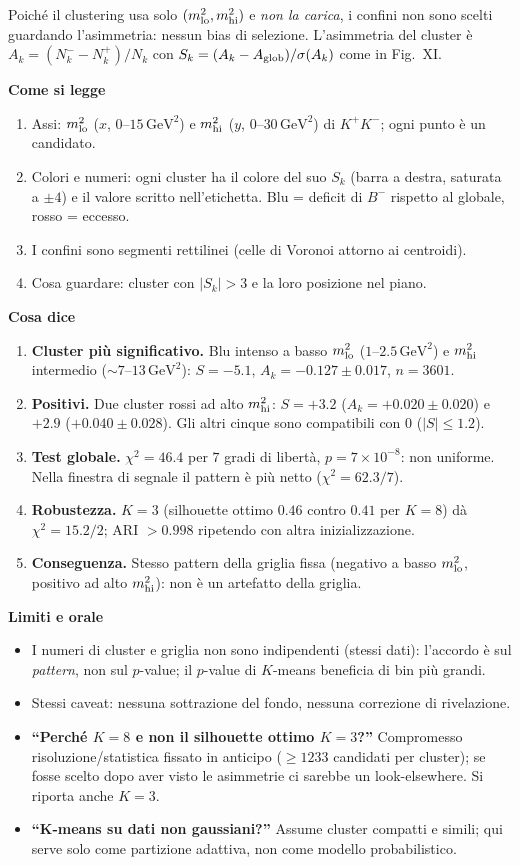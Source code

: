 \documentclass[10.5pt,a4paper]{article}
\newcommand{\GeV}{\,\mathrm{GeV}}
\newcommand{\sez}[1]{\par\Needspace{6\baselineskip}\medskip\noindent\textbf{\large #1}\par\nopagebreak\smallskip}
\begin{document}
Poiché il clustering usa solo $(m^2_{\rm lo},m^2_{\rm hi})$ e \emph{non la carica}, i confini non sono scelti guardando l'asimmetria: nessun bias di selezione. L'asimmetria del cluster è $A_k=(N_k^--N_k^+)/N_k$ con $S_k=(A_k-A_{\rm glob})/\sigma(A_k)$ come in Fig.~XI.

\sez{Come si legge}
\begin{enumerate}
\item Assi: $m^2_{\rm lo}$ ($x$, $0$--$15\GeV^2$) e $m^2_{\rm hi}$ ($y$, $0$--$30\GeV^2$) di $K^+K^-$; ogni punto è un candidato.
\item Colori e numeri: ogni cluster ha il colore del suo $S_k$ (barra a destra, saturata a $\pm4$) e il valore scritto nell'etichetta. Blu = deficit di $B^-$ rispetto al globale, rosso = eccesso.
\item I confini sono segmenti rettilinei (celle di Voronoi attorno ai centroidi).
\item Cosa guardare: cluster con $|S_k|>3$ e la loro posizione nel piano.
\end{enumerate}

\sez{Cosa dice}
\begin{enumerate}
\item \textbf{Cluster più significativo.} Blu intenso a basso $m^2_{\rm lo}$ ($1$--$2.5\GeV^2$) e $m^2_{\rm hi}$ intermedio ($\sim7$--$13\GeV^2$): $S=-5.1$, $A_k=-0.127\pm0.017$, $n=3601$.
\item \textbf{Positivi.} Due cluster rossi ad alto $m^2_{\rm hi}$: $S=+3.2$ ($A_k=+0.020\pm0.020$) e $+2.9$ ($+0.040\pm0.028$). Gli altri cinque sono compatibili con $0$ ($|S|\le1.2$).
\item \textbf{Test globale.} $\chi^2=46.4$ per $7$ gradi di libertà, $p=7\times10^{-8}$: non uniforme. Nella finestra di segnale il pattern è più netto ($\chi^2=62.3/7$).
\item \textbf{Robustezza.} $K=3$ (silhouette ottimo $0.46$ contro $0.41$ per $K=8$) dà $\chi^2=15.2/2$; ARI $>0.998$ ripetendo con altra inizializzazione.
\item \textbf{Conseguenza.} Stesso pattern della griglia fissa (negativo a basso $m^2_{\rm lo}$, positivo ad alto $m^2_{\rm hi}$): non è un artefatto della griglia.
\end{enumerate}

\sez{Limiti e orale}
\begin{itemize}
\item I numeri di cluster e griglia non sono indipendenti (stessi dati): l'accordo è sul \emph{pattern}, non sul $p$-value; il $p$-value di $K$-means beneficia di bin più grandi.
\item Stessi caveat: nessuna sottrazione del fondo, nessuna correzione di rivelazione.
\item \textbf{``Perché $K=8$ e non il silhouette ottimo $K=3$?''} Compromesso risoluzione/statistica fissato in anticipo ($\ge1233$ candidati per cluster); se fosse scelto dopo aver visto le asimmetrie ci sarebbe un look-elsewhere. Si riporta anche $K=3$.
\item \textbf{``K-means su dati non gaussiani?''} Assume cluster compatti e simili; qui serve solo come partizione adattiva, non come modello probabilistico.
\end{itemize}
\end{document}
